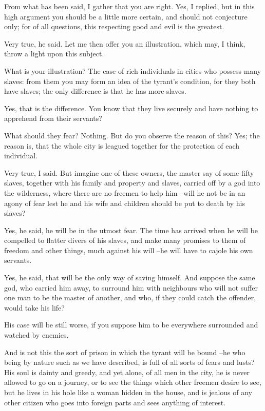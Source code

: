 From what has been said, I gather that you are right.
Yes, I replied, but in this high argument you should be a little more certain, and should not conjecture only; for of all questions, this respecting good and evil is the greatest.

Very true, he said.
Let me then offer you an illustration, which may, I think, throw a light upon this subject.

What is your illustration?
The case of rich individuals in cities who possess many slaves: from them you may form an idea of the tyrant's condition, for they both have slaves; the only difference is that he has more slaves.

Yes, that is the difference.
You know that they live securely and have nothing to apprehend from their servants?

What should they fear?
Nothing. But do you observe the reason of this?
Yes; the reason is, that the whole city is leagued together for the protection of each individual.

Very true, I said. But imagine one of these owners, the master say of some fifty slaves, together with his family and property and slaves, carried off by a god into the wilderness, where there are no freemen to help him --will he not be in an agony of fear lest he and his wife and children should be put to death by his slaves?

Yes, he said, he will be in the utmost fear.
The time has arrived when he will be compelled to flatter divers of his slaves, and make many promises to them of freedom and other things, much against his will --he will have to cajole his own servants.

Yes, he said, that will be the only way of saving himself.
And suppose the same god, who carried him away, to surround him with neighbours who will not suffer one man to be the master of another, and who, if they could catch the offender, would take his life?

His case will be still worse, if you suppose him to be everywhere surrounded and watched by enemies.

And is not this the sort of prison in which the tyrant will be bound --he who being by nature such as we have described, is full of all sorts of fears and lusts? His soul is dainty and greedy, and yet alone, of all men in the city, he is never allowed to go on a journey, or to see the things which other freemen desire to see, but he lives in his hole like a woman hidden in the house, and is jealous of any other citizen who goes into foreign parts and sees anything of interest.

